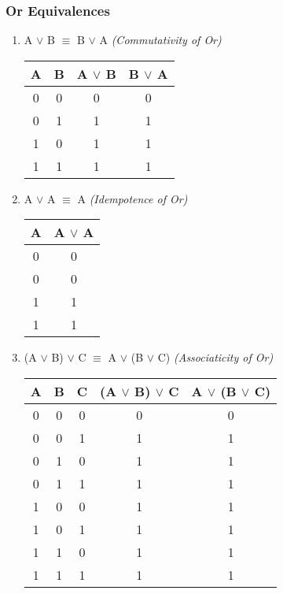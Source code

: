\documentclass[12pt]{article}
\begin{document}
\subsubsection{Or Equivalences}
\begin{enumerate}

  \item A $\lor$ B $\equiv$ B $\lor$ A \emph{(Commutativity of Or)}

\begin{center}
  \begin{tabular}{| c | c | c | c |}
    \hline
    A & B & A $\lor$ B & B $\lor$ A\\ \hline
    0 & 0 & 0 & 0 \\
    0 & 1 & 1 & 1 \\
    1 & 0 & 1 & 1 \\
    1 & 1 & 1 & 1 \\ \hline
  \end{tabular}
\end{center}

\item A $\lor$ A $\equiv$ A \emph{(Idempotence of Or)}

\begin{center}
  \begin{tabular}{| c | c |}
    \hline
    A & A $\lor$ A \\ \hline
    0 & 0 \\
    0 & 0 \\
    1 & 1 \\
    1 & 1 \\ \hline
  \end{tabular}
\end{center}

  \item (A $\lor$ B) $\lor$ C $\equiv$ A $\lor$ (B $\lor$ C) \emph{(Associaticity of Or)}

\begin{center}
  \begin{tabular}{| c | c | c | c | c |}
    \hline
    A & B & C & (A $\lor$ B) $\lor$ C & A $\lor$ (B $\lor$ C) \\ \hline
    0 & 0 & 0 & 0 & 0 \\
    0 & 0 & 1 & 1 & 1 \\
    0 & 1 & 0 & 1 & 1 \\
    0 & 1 & 1 & 1 & 1 \\
    1 & 0 & 0 & 1 & 1 \\
    1 & 0 & 1 & 1 & 1 \\
    1 & 1 & 0 & 1 & 1 \\
    1 & 1 & 1 & 1 & 1 \\ \hline
  \end{tabular}
\end{center}
\end{enumerate}
\end{document}

